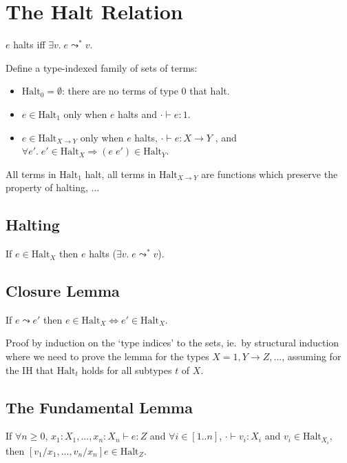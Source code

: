 \documentclass[11pt]{article}
\begin{document}
\section{The Halt Relation}
{

    \(e\) halts iff \(\exists v.\; e \leadsto^* v\).

    Define a type-indexed family of sets of terms: 
    \begin{itemize}
    \item \(\text{Halt}_0 = \emptyset\): there are no terms of type \(0\) that halt.
    \item \(e \in \text{Halt}_1\) only when \(e\) halts and \(\cdot \vdash e : 1\).
    \item \(e \in \text{Halt}_{X \rightarrow Y}\) only when \(e\) halts, \(\cdot \vdash e : X \rightarrow Y\) , and
    \(\forall e'.\; e' \in \text{Halt}_X \Longrightarrow (e\;e') \in \text{Halt}_Y\).
    \end{itemize}

    All terms in \(\text{Halt}_1\) halt, all terms in \(\text{Halt}_{X \rightarrow Y}\) are functions which preserve the
    property of halting, ...

    \subsection*{Halting}
    {
        If \(e\in\text{Halt}_X\) then \(e\) halts (\(\exists v.\;e \leadsto^* v\)).

    }
    \subsection*{Closure Lemma}
    {
        If \(e \leadsto e'\) then \(e \in \text{Halt}_X \Longleftrightarrow e' \in \text{Halt}_X\).
        
        Proof by induction on the `type indices' to the sets, ie.\ by structural induction where we need to prove the
        lemma for the types \(X = 1, Y \rightarrow Z, ...\), assuming for the IH that \(\text{Halt}_t\) holds for all
        subtypes \(t\) of \(X\).

    }
    \subsection*{The Fundamental Lemma}
    {
        
        If \(\forall n \geq 0\), \(x_1:X_1,...,x_n:X_n \vdash e : Z\) and \(\forall i\in[1..n]\), \(\cdot\vdash
        v_i:X_i\) and \(v_i \in \text{Halt}_{X_i}\), then \([v_1/x_1,...,v_n/x_n]e \in \text{Halt}_Z\).

}}
\end{document}
